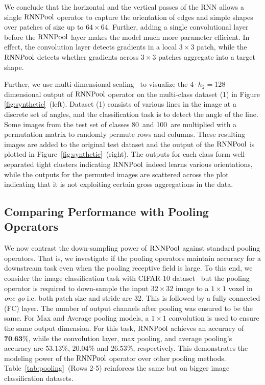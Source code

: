 \documentclass[10pt]{article}
\newcommand{\rpool}{\ensuremath{{\rm RNNPool}}\xspace}
\begin{document}
We conclude that the horizontal and the vertical passes of the RNN
allows a single \rpool operator to capture the orientation of edges
and simple shapes over patches of size up to $64\times 64$.  Further,
adding a single convolutional layer before the \rpool layer makes the
model much more parameter efficient. In effect, the convolution layer
detects gradients in a local $3\times 3$ patch, while the \rpool
detects whether gradients across $3\times 3$ patches aggregate into a
target shape.




Further, we use multi-dimensional scaling~\citep{mead1992review} to
visualize the $4\cdot h_2 = 128$ dimensional output of \rpool operator
on the multi-class dataset (1) in Figure
\ref{fig:synthetic}~(left). Dataset (1) consists of various lines in
the image at a discrete set of angles, and the classification task is
to detect the angle of the line. Some images from the test set of
classes 80\textdegree~and 100\textdegree~are multiplied with a
permutation matrix to randomly permute rows and columns. These
resulting images are added to the original test dataset and the output
of the \rpool is plotted in Figure~\ref{fig:synthetic}~(right). The
outputs for each class form well-separated tight clusters indicating
\rpool indeed learns various orientations, while the outputs for the
permuted images are scattered across the plot indicating that it is
not exploiting certain gross aggregations in the data.



\subsection{Comparing Performance with Pooling Operators}
\label{sec:cifar}
We now contrast the down-sampling power of \rpool against standard
pooling operators. That is, we investigate if the pooling operators
maintain accuracy for a downstream task even when the pooling
receptive field is large. To this end, we consider the image
classification task with CIFAR-10 dataset~\citep{krizhevsky2009learning} but the pooling operator is
required to down-sample the input $32\times32$ image to a $1\times1$
voxel in {\em one go } i.e. both patch size and stride are 32. This is
followed by a fully connected (FC) layer. The number of output
channels after pooling was ensured to be the same. For Max and Average
pooling models, a $1\times 1$ convolution is used to ensure the same
output dimension. For this task, \rpool achieves an accuracy of
{$\textbf{70.63\%}$}, while the convolution layer, max pooling, and average
pooling's accuracy are $53.13\%$, $20.04\%$ and $26.53\%$,
respectively. This demonstrates the modeling power of the \rpool
operator over other pooling methods. Table~\ref{tab:pooling}~(Rows
2-5) reinforces the same but on bigger image classification datasets.
\end{document}
